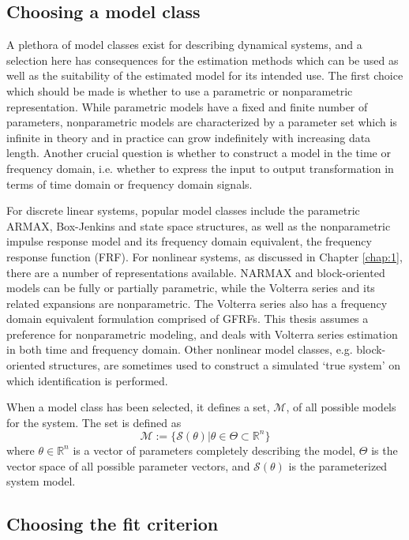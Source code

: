 \subsection{Choosing a model class}

A plethora of model classes exist for describing dynamical systems, and a selection here has consequences for the estimation methods which can be used as well as the suitability of the estimated model for its intended use. The first choice which should be made is whether to use a parametric or nonparametric representation. While parametric models have a fixed and finite number of parameters, nonparametric models are characterized by a parameter set which is infinite in theory and in practice can grow indefinitely with increasing data length. Another crucial question is whether to construct a model in the time or frequency domain, i.e. whether to express the input to output transformation in terms of time domain or frequency domain signals.

For discrete linear systems, popular model classes include the parametric ARMAX, Box-Jenkins and state space structures, as well as the nonparametric impulse response model and its frequency domain equivalent, the frequency response function (FRF). For nonlinear systems, as discussed in Chapter \ref{chap:1}, there are a number of representations available. NARMAX and block-oriented models can be fully or partially parametric, while the Volterra series and its related expansions are nonparametric. The Volterra series also has a frequency domain equivalent formulation comprised of GFRFs. This thesis assumes a preference for nonparametric modeling, and deals with Volterra series estimation in both time and frequency domain. Other nonlinear model classes, e.g. block-oriented structures, are sometimes used to construct a simulated `true system' on which identification is performed.

When a model class has been selected, it defines a set, $\mathcal{M}$, of all possible models for the system. The set is defined as
\begin{equation}
\mathcal{M} := \{ \mathcal{S}(\theta) | \theta \in \Theta \subset \mathbb{R}^n \}
\end{equation}
where $\theta \in \mathbb{R}^n$ is a vector of parameters completely describing the model, $\Theta$ is the vector space of all possible parameter vectors, and $\mathcal{S}(\theta)$ is the parameterized system model.


\subsection{Choosing the fit criterion}

